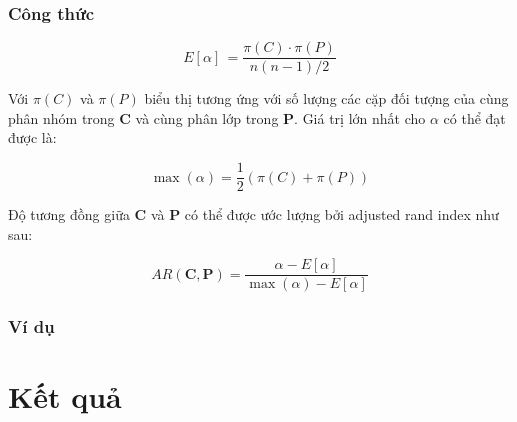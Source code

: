 		\subsubsection{Công thức}
		\begin{center}
		\begin{equation}
			E[\alpha] \, = \frac{\pi(C) \cdot \pi(P)}{n(n - 1) / 2}
		\end{equation}
		\end{center}
		
		Với $\pi(C)$ và $\pi(P)$ biểu thị tương ứng với số lượng các cặp đối tượng của cùng phân nhóm trong $	\textbf{C}$ và cùng phân lớp trong $\textbf{P}$. Giá trị lớn nhất cho $\alpha$ có thể đạt được là:
		\begin{center}
		\begin{equation}
			\max(\alpha) = \frac{1}{2} (\pi(C) + \pi(P))
		\end{equation}
		\end{center}
		
		Độ tương đồng giữa $\textbf{C}$ và $\textbf{P}$ có thể được ước lượng bởi adjusted rand index như sau:
		\begin{center}
		\begin{equation}
			AR(\textbf{C}, \textbf{P}) = \frac{\alpha - E[\alpha]}{\max(\alpha) - E[\alpha]}
		\end{equation}
		\end{center}

		\subsubsection{Ví dụ}

\section{Kết quả}




